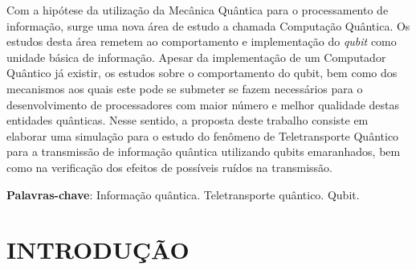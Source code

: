 \documentclass[12pt,oneside,brazil,hidelinks,article,sumario=tradicional,a4paper]{abntex2}
\renewcommand{\imprimircapa}{%
  \begin{capa}%
    \centering
    {\imprimirinstituicao\vfill}

    {\ABNTEXchapterfont\large\imprimirautor}

    \vfill
    {\ABNTEXchapterfont\bfseries\LARGE\imprimirtitulo}
    \vfill

    \large\imprimirlocal

    \large\imprimirdata

    \vspace*{15mm}
  \end{capa}
}
\begin{document}
\pretextual
\imprimircapa

\begin{resumo} 

Com a hipótese da utilização da Mecânica Quântica para o processamento de informação, surge uma nova área de estudo a chamada Computação Quântica. Os estudos desta área remetem ao comportamento e implementação do  \textit{qubit} como unidade básica de informação. Apesar da implementação de um Computador Quântico já existir, os estudos sobre o comportamento do qubit, bem como dos mecanismos aos quais este pode se submeter se fazem necessários para o desenvolvimento de processadores com maior número e melhor qualidade destas entidades quânticas. Nesse sentido, a proposta deste trabalho consiste em elaborar uma simulação para o estudo do fenômeno de Teletransporte Quântico para a transmissão de informação quântica utilizando qubits emaranhados, bem como na verificação dos efeitos de possíveis ruídos na transmissão.


  \vspace{\onelineskip}

  \noindent
  \textbf{Palavras-chave}: Informação quântica. Teletransporte quântico. Qubit.
\end{resumo}
\newpage







 \tableofcontents*
 \clearpage


\textual%

\section{INTRODUÇÃO}\label{sec:intro}
\end{document}
